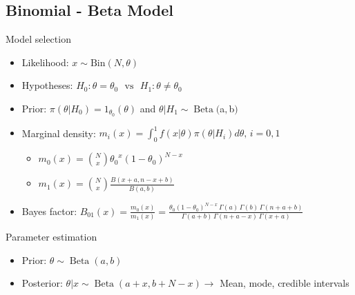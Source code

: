\subsection{Binomial - Beta Model}


\begin{frame}{Model selection}

\begin{itemize}

\item Likelihood: $x \sim \text{Bin}(N, \theta)$

\item  Hypotheses: $ H_0: {\theta}={\theta_0} \,\,\,\, \text{vs} \,\,\,\,  H_1: {\theta} \neq \theta_0$

\item Prior: $\pi(\theta|H_0)={1_{\theta_0}(\theta)}$ and $\theta| H_1 \sim \operatorname{Beta}($a$,$b$) $

\item Marginal density: $m_i(x)= \int_0^1 f(x|\theta)\pi(\theta|H_i)d \theta, \,  i=0, 1$

\begin{itemize}

\item $m_0(x)=\binom{N}{x} {\theta_0}^{x}{(1-\theta_0)}^{N-x}$ 

\item  $m_1(x) = \binom{N}{x}\frac{B(x+a, n-x+b)}{B(a,b)}$

\end{itemize}

\item Bayes factor: $B_{01}(x) = \frac{m_0(x)}{m_1(x)}  = \frac{\theta_0(1-\theta_0)^{N-x}\,\Gamma(a)\,\Gamma(b)\,\Gamma(n+a+b)}{\Gamma(a+b)\,\Gamma(n+a-x)\,\Gamma(x+a)}$ 

\end{itemize}

\end{frame}


\begin{frame}{Parameter estimation}

\begin{itemize}

\item Prior: $\theta \sim \operatorname{Beta}(a,b) $

\item Posterior: $\theta | x \sim \operatorname{Beta}(a+x, b+N-x ) \rightarrow$ Mean, mode, credible intervals

\end{itemize}

\end{frame}

